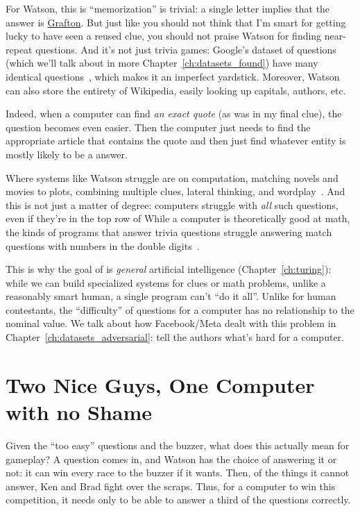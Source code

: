 For Watson, this is ``memorization'' is trivial: a single letter
implies that the answer is \underline{Grafton}.
%
But just like you should not think that I'm smart for getting lucky to
have seen a reused clue, you should not praise Watson for finding
near-repeat questions.
%
And it's not just trivia games: Google's dataset of questions (which
we'll talk about in more Chapter~\ref{ch:datasets_found}) have
many identical questions~\citep{lewis-21}, which makes it an imperfect yardstick.
%
Moreover, Watson can also store the entirety of Wikipedia, easily
looking up capitals, authors, etc.

Indeed, when a computer can find \emph{an exact quote} (as was in my
final \jeopardy{} clue), the question becomes even easier.
%
Then the computer just needs to find the appropriate article that
contains the quote and then just find whatever entity is mostly likely
to be a \jeopardy{} answer.

Where systems like Watson struggle are on computation, matching novels
and movies to plots, combining multiple clues, lateral thinking, and
wordplay~\citep{kaushik-18}.
%
And this is not just a matter of degree: computers struggle with \emph{all}
such questions, even if they're in the top row of \jeopardyf{}
%
While a computer is theoretically good at math, the kinds of programs
that answer trivia questions struggle answering match questions with
numbers in the double digits~\citep{wallace-19:numbers}.

This is why the goal of  is \emph{general} artificial
intelligence (Chapter~\ref{ch:turing}): while we can build specialized
systems for \jeopardy{} clues or math problems, unlike a
reasonably smart human, a single program can't ``do it all''.
%
Unlike for human contestants, the ``difficulty'' of \jeopardy{}
questions for a computer has no relationship to the nominal value.
%
We talk about how Facebook/Meta dealt with this problem in
Chapter~\ref{ch:datasets_adversarial}: tell the authors what's hard for a computer.

\section{Two Nice Guys, One Computer with no Shame}
\label{sec:watson:strategy}


Given the ``too easy'' questions and the buzzer, what does this
actually mean for gameplay?
%
A question comes in, and Watson has the choice of answering it or not:
it can win every race to the buzzer if it wants.
%
Then, of the things it cannot answer, Ken and Brad fight over the
scraps.
%
Thus, for a computer to win this competition, it needs only to be able
to answer a third of the questions correctly.

